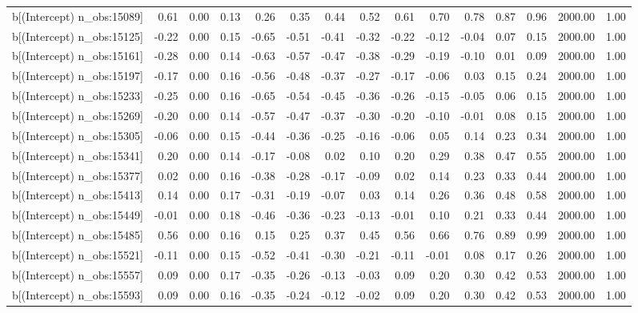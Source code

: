 \begin{table}[ht]
\begin{tabular}{rrrrrrrrrrrrrrr}
  b[(Intercept) n\_obs:15089] & 0.61 & 0.00 & 0.13 & 0.26 & 0.35 & 0.44 & 0.52 & 0.61 & 0.70 & 0.78 & 0.87 & 0.96 & 2000.00 & 1.00 \\ 
  b[(Intercept) n\_obs:15125] & -0.22 & 0.00 & 0.15 & -0.65 & -0.51 & -0.41 & -0.32 & -0.22 & -0.12 & -0.04 & 0.07 & 0.15 & 2000.00 & 1.00 \\ 
  b[(Intercept) n\_obs:15161] & -0.28 & 0.00 & 0.14 & -0.63 & -0.57 & -0.47 & -0.38 & -0.29 & -0.19 & -0.10 & 0.01 & 0.09 & 2000.00 & 1.00 \\ 
  b[(Intercept) n\_obs:15197] & -0.17 & 0.00 & 0.16 & -0.56 & -0.48 & -0.37 & -0.27 & -0.17 & -0.06 & 0.03 & 0.15 & 0.24 & 2000.00 & 1.00 \\ 
  b[(Intercept) n\_obs:15233] & -0.25 & 0.00 & 0.16 & -0.65 & -0.54 & -0.45 & -0.36 & -0.26 & -0.15 & -0.05 & 0.06 & 0.15 & 2000.00 & 1.00 \\ 
  b[(Intercept) n\_obs:15269] & -0.20 & 0.00 & 0.14 & -0.57 & -0.47 & -0.37 & -0.30 & -0.20 & -0.10 & -0.01 & 0.08 & 0.15 & 2000.00 & 1.00 \\ 
  b[(Intercept) n\_obs:15305] & -0.06 & 0.00 & 0.15 & -0.44 & -0.36 & -0.25 & -0.16 & -0.06 & 0.05 & 0.14 & 0.23 & 0.34 & 2000.00 & 1.00 \\ 
  b[(Intercept) n\_obs:15341] & 0.20 & 0.00 & 0.14 & -0.17 & -0.08 & 0.02 & 0.10 & 0.20 & 0.29 & 0.38 & 0.47 & 0.55 & 2000.00 & 1.00 \\ 
  b[(Intercept) n\_obs:15377] & 0.02 & 0.00 & 0.16 & -0.38 & -0.28 & -0.17 & -0.09 & 0.02 & 0.14 & 0.23 & 0.33 & 0.44 & 2000.00 & 1.00 \\ 
  b[(Intercept) n\_obs:15413] & 0.14 & 0.00 & 0.17 & -0.31 & -0.19 & -0.07 & 0.03 & 0.14 & 0.26 & 0.36 & 0.48 & 0.58 & 2000.00 & 1.00 \\ 
  b[(Intercept) n\_obs:15449] & -0.01 & 0.00 & 0.18 & -0.46 & -0.36 & -0.23 & -0.13 & -0.01 & 0.10 & 0.21 & 0.33 & 0.44 & 2000.00 & 1.00 \\ 
  b[(Intercept) n\_obs:15485] & 0.56 & 0.00 & 0.16 & 0.15 & 0.25 & 0.37 & 0.45 & 0.56 & 0.66 & 0.76 & 0.89 & 0.99 & 2000.00 & 1.00 \\ 
  b[(Intercept) n\_obs:15521] & -0.11 & 0.00 & 0.15 & -0.52 & -0.41 & -0.30 & -0.21 & -0.11 & -0.01 & 0.08 & 0.17 & 0.26 & 2000.00 & 1.00 \\ 
  b[(Intercept) n\_obs:15557] & 0.09 & 0.00 & 0.17 & -0.35 & -0.26 & -0.13 & -0.03 & 0.09 & 0.20 & 0.30 & 0.42 & 0.53 & 2000.00 & 1.00 \\ 
  b[(Intercept) n\_obs:15593] & 0.09 & 0.00 & 0.16 & -0.35 & -0.24 & -0.12 & -0.02 & 0.09 & 0.20 & 0.30 & 0.42 & 0.53 & 2000.00 & 1.00 \\ 

\end{tabular}
\end{table}
